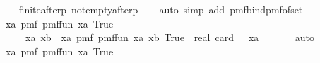 \begin{isabellebody}
\ \ \isamarkupfalse%
\ {\isasymK}{\isacharunderscore}{\kern0pt}finite{\isacharunderscore}{\kern0pt}after{\isacharunderscore}{\kern0pt}p\ {\isasymK}{\isacharunderscore}{\kern0pt}not{\isacharunderscore}{\kern0pt}empty{\isacharunderscore}{\kern0pt}after{\isacharunderscore}{\kern0pt}p\isanewline
\ \ \isamarkupfalse%
\ {\isacharparenleft}{\kern0pt}auto\ simp\ add{\isacharcolon}{\kern0pt}\ pmf{\isacharunderscore}{\kern0pt}bind{\isacharunderscore}{\kern0pt}pmf{\isacharunderscore}{\kern0pt}of{\isacharunderscore}{\kern0pt}set{\isacharparenright}{\kern0pt}\isanewline
\isanewline
\ \ \isamarkupfalse%
\ \isamarkupfalse%
\ {\isachardoublequoteopen}{\isacharparenleft}{\kern0pt}{\isasymSum}xa{\isasymin}{\isacharquery}{\kern0pt}{\isasymK}{\isachardot}{\kern0pt}\ pmf\ {\isacharparenleft}{\kern0pt}{\isacharquery}{\kern0pt}pmf{\isacharunderscore}{\kern0pt}fun{\isacharprime}{\kern0pt}\ xa{\isacharparenright}{\kern0pt}\ True{\isacharparenright}{\kern0pt}\ {\isacharequal}{\kern0pt}\ \isanewline
\ \ \ \ \ {\isacharparenleft}{\kern0pt}{\isasymSum}xa{\isasymin}{\isacharquery}{\kern0pt}{\isasymK}{\isachardot}{\kern0pt}\ {\isacharparenleft}{\kern0pt}{\isasymSum}xb{\isasymin}{\isacharparenleft}{\kern0pt}{\isacharquery}{\kern0pt}{\isasymK}\ {\isacharminus}{\kern0pt}\ {\isacharbraceleft}{\kern0pt}xa{\isacharbraceright}{\kern0pt}{\isacharparenright}{\kern0pt}{\isachardot}{\kern0pt}\ pmf\ {\isacharparenleft}{\kern0pt}{\isacharparenleft}{\kern0pt}{\isacharquery}{\kern0pt}pmf{\isacharunderscore}{\kern0pt}fun{\isacharprime}{\kern0pt}{\isacharprime}{\kern0pt}\ xa{\isacharparenright}{\kern0pt}\ xb{\isacharparenright}{\kern0pt}\ True{\isacharparenright}{\kern0pt}\ {\isacharslash}{\kern0pt}\ real\ {\isacharparenleft}{\kern0pt}card\ {\isacharparenleft}{\kern0pt}{\isacharquery}{\kern0pt}{\isasymK}\ {\isacharminus}{\kern0pt}\ {\isacharbraceleft}{\kern0pt}xa{\isacharbraceright}{\kern0pt}{\isacharparenright}{\kern0pt}{\isacharparenright}{\kern0pt}{\isacharparenright}{\kern0pt}{\isachardoublequoteclose}\ \isanewline
\ \ \ \ \isamarkupfalse%
\ auto\isanewline
\isanewline
\ \ \isamarkupfalse%
\ \isamarkupfalse%
\ {\isachardoublequoteopen}{\isacharparenleft}{\kern0pt}{\isasymSum}xa{\isasymin}{\isacharquery}{\kern0pt}{\isasymK}{\isachardot}{\kern0pt}\ pmf\ {\isacharparenleft}{\kern0pt}{\isacharquery}{\kern0pt}pmf{\isacharunderscore}{\kern0pt}fun{\isacharprime}{\kern0pt}\ xa{\isacharparenright}{\kern0pt}\ True{\isacharparenright}{\kern0pt}\ {\isacharequal}{\kern0pt}\isanewline

\end{isabellebody}
